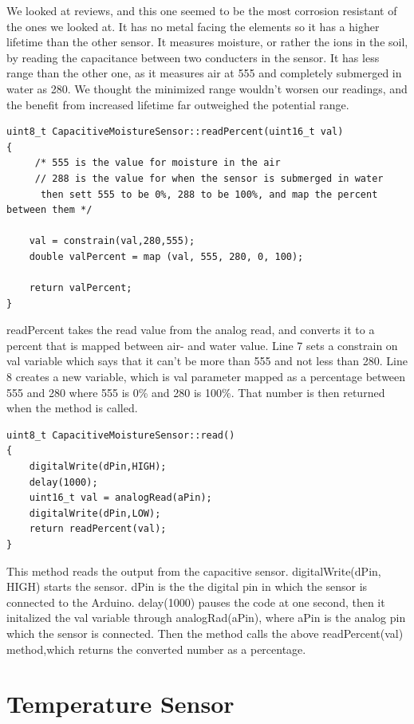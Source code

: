 \documentclass[a4paper,12pt,oneside,openright,titlepage]{book}
\begin{document}
We looked at reviews, and this one seemed to be the most corrosion resistant of the ones we looked at. It has no metal facing the elements so it has a higher lifetime than the other sensor. It measures moisture, or rather the ions in the soil, by reading the capacitance between two conducters in the sensor. It has less range than the other one, as it measures air at 555 and completely submerged in water as 280. We thought the minimized range wouldn't worsen our readings, and the benefit from increased lifetime far outweighed the potential range.

\begin{lstlisting}[language=Arduino]
uint8_t CapacitiveMoistureSensor::readPercent(uint16_t val)
{
     /* 555 is the value for moisture in the air
	 // 288 is the value for when the sensor is submerged in water
	  then sett 555 to be 0%, 288 to be 100%, and map the percent between them */
	
	val = constrain(val,280,555);
	double valPercent = map (val, 555, 280, 0, 100);

	return valPercent;
}

\end{lstlisting}
readPercent takes the read value from the analog read, and converts it to a percent that is mapped between air- and water value. Line 7 sets a constrain on val variable which says that it can't be more than 555 and not less than 280. Line 8 creates a new variable, which is val parameter mapped as a percentage between 555 and 280 where 555 is 0\% and 280 is 100\%. That number is then returned when the method is called.

\begin{lstlisting}[language=Arduino]
uint8_t CapacitiveMoistureSensor::read()
{
	digitalWrite(dPin,HIGH);
	delay(1000);
    uint16_t val = analogRead(aPin);
	digitalWrite(dPin,LOW);
    return readPercent(val);
}
\end{lstlisting}

This method reads the output from the capacitive sensor. digitalWrite(dPin, HIGH) starts the sensor. dPin is the the digital pin in which the sensor is connected to the Arduino. delay(1000) pauses the code at one second, then it initalized the val variable through analogRad(aPin), where aPin is the analog pin which the sensor is connected. Then the method calls the above readPercent(val) method,which returns the converted number as a percentage.

\section{Temperature Sensor}
\end{document}
